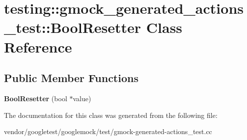 \hypertarget{classtesting_1_1gmock__generated__actions__test_1_1_bool_resetter}{}\section{testing\+:\+:gmock\+\_\+generated\+\_\+actions\+\_\+test\+:\+:Bool\+Resetter Class Reference}
\label{classtesting_1_1gmock__generated__actions__test_1_1_bool_resetter}
\subsection*{Public Member Functions}
\begin{DoxyCompactItemize}
\item 
\mbox{\label{classtesting_1_1gmock__generated__actions__test_1_1_bool_resetter_a55776cb9ef3b358e48898bb0257646ea}} 
{\bfseries Bool\+Resetter} (bool $\ast$value)
\end{DoxyCompactItemize}


The documentation for this class was generated from the following file\+:\begin{DoxyCompactItemize}
\item 
vendor/googletest/googlemock/test/gmock-\/generated-\/actions\+\_\+test.\+cc\end{DoxyCompactItemize}
